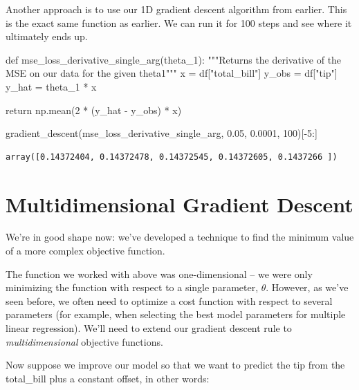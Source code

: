\documentclass[
  letterpaper,
  DIV=11,
  numbers=noendperiod]{scrreprt}
\newenvironment{Shaded}{\begin{snugshade}}{\end{snugshade}}
\newcommand{\CommentTok}[1]{\textcolor[rgb]{0.37,0.37,0.37}{#1}}
\newcommand{\ControlFlowTok}[1]{\textcolor[rgb]{0.00,0.23,0.31}{#1}}
\newcommand{\DecValTok}[1]{\textcolor[rgb]{0.68,0.00,0.00}{#1}}
\newcommand{\FloatTok}[1]{\textcolor[rgb]{0.68,0.00,0.00}{#1}}
\newcommand{\KeywordTok}[1]{\textcolor[rgb]{0.00,0.23,0.31}{#1}}
\newcommand{\NormalTok}[1]{\textcolor[rgb]{0.00,0.23,0.31}{#1}}
\newcommand{\OperatorTok}[1]{\textcolor[rgb]{0.37,0.37,0.37}{#1}}
\newcommand{\StringTok}[1]{\textcolor[rgb]{0.13,0.47,0.30}{#1}}
\begin{document}
Another approach is to use our 1D gradient descent algorithm from
earlier. This is the exact same function as earlier. We can run it for
100 steps and see where it ultimately ends up.

\begin{Shaded}
\begin{Highlighting}[]
\KeywordTok{def}\NormalTok{ mse\_loss\_derivative\_single\_arg(theta\_1):}
    \CommentTok{"""Returns the derivative of the MSE on our data for the given theta1"""}
\NormalTok{    x }\OperatorTok{=}\NormalTok{ df[}\StringTok{"total\_bill"}\NormalTok{]}
\NormalTok{    y\_obs }\OperatorTok{=}\NormalTok{ df[}\StringTok{"tip"}\NormalTok{]}
\NormalTok{    y\_hat }\OperatorTok{=}\NormalTok{ theta\_1 }\OperatorTok{*}\NormalTok{ x}
    
    \ControlFlowTok{return}\NormalTok{ np.mean(}\DecValTok{2} \OperatorTok{*}\NormalTok{ (y\_hat }\OperatorTok{{-}}\NormalTok{ y\_obs) }\OperatorTok{*}\NormalTok{ x)}

\NormalTok{gradient\_descent(mse\_loss\_derivative\_single\_arg, }\FloatTok{0.05}\NormalTok{, }\FloatTok{0.0001}\NormalTok{, }\DecValTok{100}\NormalTok{)[}\OperatorTok{{-}}\DecValTok{5}\NormalTok{:]}
\end{Highlighting}
\end{Shaded}

\begin{verbatim}
array([0.14372404, 0.14372478, 0.14372545, 0.14372605, 0.1437266 ])
\end{verbatim}

\hypertarget{multidimensional-gradient-descent}{%
\section{Multidimensional Gradient
Descent}\label{multidimensional-gradient-descent}}

We're in good shape now: we've developed a technique to find the minimum
value of a more complex objective function.

The function we worked with above was one-dimensional -- we were only
minimizing the function with respect to a single parameter, \(\theta\).
However, as we've seen before, we often need to optimize a cost function
with respect to several parameters (for example, when selecting the best
model parameters for multiple linear regression). We'll need to extend
our gradient descent rule to \emph{multidimensional} objective
functions.

Now suppose we improve our model so that we want to predict the tip from
the total\_bill plus a constant offset, in other words:
\end{document}

